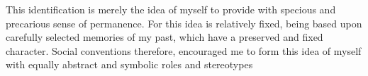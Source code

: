 \documentclass[10pt,a4paper,ragged2e,withhyper]{altacv}
\begin{document}




\makecvheader




\begin{raggedright}
This identification is merely the idea of myself to provide with
specious and precarious sense of permanence. For this idea is
relatively fixed, being based upon carefully selected memories of
my past, which have a preserved and fixed character. Social
conventions therefore, encouraged me to form this idea of myself
with equally abstract and symbolic roles and stereotypes
\end{raggedright}
\end{document}
